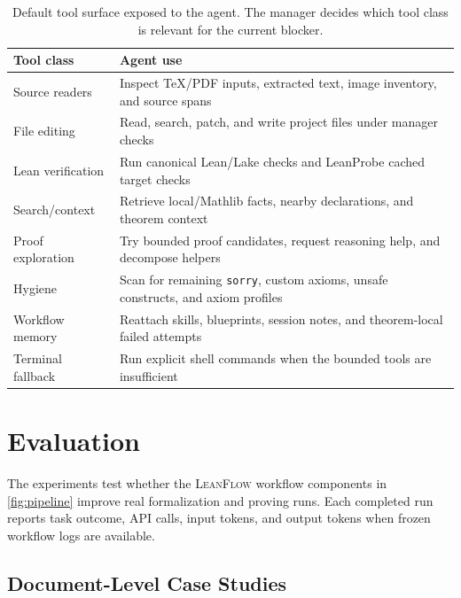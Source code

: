 \documentclass{article}
\newcommand{\method}{\textsc{LeanFlow}\xspace}
\newcommand{\lean}{Lean\xspace}
\newcommand{\mathlib}{Mathlib\xspace}
\begin{document}
\begin{table}[H]
\centering
\caption{Default tool surface exposed to the agent. The manager decides which tool class is relevant for the current blocker.}
\label{tab:toolset}
\scriptsize
\setlength{\tabcolsep}{3pt}
\begin{tabular}{p{21mm}p{54mm}}
\toprule
Tool class & Agent use \\
\midrule
Source readers & Inspect \TeX/PDF inputs, extracted text, image inventory, and source spans \\
File editing & Read, search, patch, and write project files under manager checks \\
Lean verification & Run canonical \lean/Lake checks and LeanProbe cached target checks \\
Search/context & Retrieve local/\mathlib facts, nearby declarations, and theorem context \\
Proof exploration & Try bounded proof candidates, request reasoning help, and decompose helpers \\
Hygiene & Scan for remaining \texttt{sorry}, custom axioms, unsafe constructs, and axiom profiles \\
Workflow memory & Reattach skills, blueprints, session notes, and theorem-local failed attempts \\
Terminal fallback & Run explicit shell commands when the bounded tools are insufficient \\
\bottomrule
\end{tabular}
\end{table}

\section{Evaluation}
\label{sec:experiments}

The experiments test whether the \method workflow components in \cref{fig:pipeline} improve real formalization and proving runs.
Each completed run reports task outcome, API calls, input tokens, and output tokens when frozen workflow logs are available.

\subsection{Document-Level Case Studies}
\end{document}

